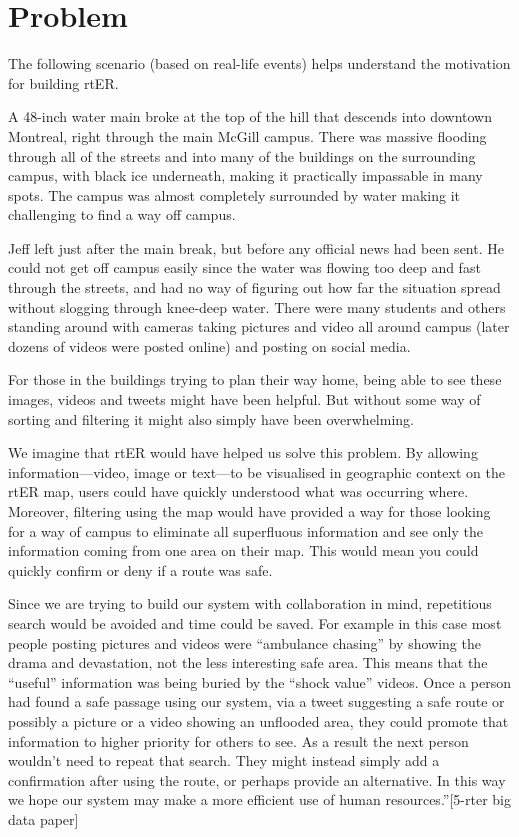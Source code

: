 \section{Problem}
The following scenario (based on real-life events) helps understand the motivation for building rtER.

\begin{munquote}
A 48-inch water main broke at the top of the hill that descends into downtown Montreal, right through the main McGill campus. There was massive flooding through all of the streets and into many of the buildings on the surrounding campus, with black ice underneath, making it practically impassable in many spots. The campus was almost completely surrounded by water making it challenging to find a way off campus.

Jeff left just after the main break, but before any official news had been sent. He could not get off campus easily since the water was flowing too deep and fast through the streets, and had no way of figuring out how far the situation spread without slogging through knee-deep water. There were many students and others standing around with cameras taking pictures and video all around campus (later dozens of videos were posted online) and posting on social media.

For those in the buildings trying to plan their way home, being able to see these images, videos and tweets might have been helpful. But without some way of sorting and filtering it might also simply have been overwhelming.

We imagine that rtER would have helped us solve this problem. By allowing information---video, image or text---to be visualised in geographic context on the rtER map, users could have quickly understood what was occurring where. Moreover, filtering using the map would have provided a way for those looking for a way of campus to eliminate all superfluous information and see only the information coming from one area on their map. This would mean you could quickly confirm or deny if a route was safe.

Since we are trying to build our system with collaboration in mind, repetitious search would be avoided and time could be saved. For example in this case most people posting pictures and videos were ``ambulance chasing'' by showing the drama and devastation, not the less interesting safe area. This means that the ``useful'' information was being buried by the ``shock value'' videos. Once a person had found a safe passage using our system, via a tweet suggesting a safe route or possibly a picture or a video showing an unflooded area, they could promote that information to higher priority for others to see. As a result the next person wouldn't need to repeat that search. They might instead simply add a confirmation after using the route, or perhaps provide an alternative. In this way we hope our system may make a more efficient use of human resources.”[5-rter big data paper]
\end{munquote}



